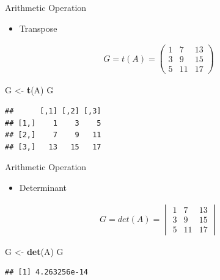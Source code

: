 \documentclass[
  ignorenonframetext,
]{beamer}
\newenvironment{Shaded}{\begin{snugshade}}{\end{snugshade}}
\newcommand{\KeywordTok}[1]{\textcolor[rgb]{0.13,0.29,0.53}{\textbf{#1}}}
\newcommand{\NormalTok}[1]{#1}
\newcommand{\StringTok}[1]{\textcolor[rgb]{0.31,0.60,0.02}{#1}}
\providecommand{\tightlist}{%
  \setlength{\itemsep}{0pt}\setlength{\parskip}{0pt}}
\begin{document}
\begin{frame}[fragile]{Arithmetic Operation}
\protect\hypertarget{arithmetic-operation-2}{}

\begin{itemize}
\tightlist
\item
  Transpose
\end{itemize}

\begin{align*}
G=t(A)=\begin{pmatrix}
1&7&13\\
3&9&15\\
5&11&17
\end{pmatrix}\end{align*}

\begin{Shaded}
\begin{Highlighting}[]
\NormalTok{G <-}\StringTok{ }\KeywordTok{t}\NormalTok{(A)}
\NormalTok{G}
\end{Highlighting}
\end{Shaded}

\begin{verbatim}
##      [,1] [,2] [,3]
## [1,]    1    3    5
## [2,]    7    9   11
## [3,]   13   15   17
\end{verbatim}

\end{frame}

\begin{frame}[fragile]{Arithmetic Operation}
\protect\hypertarget{arithmetic-operation-3}{}

\begin{itemize}
\tightlist
\item
  Determinant
\end{itemize}

\begin{align*}
G=det(A)=\begin{vmatrix}
1&7&13\\
3&9&15\\
5&11&17
\end{vmatrix}\end{align*}

\begin{Shaded}
\begin{Highlighting}[]
\NormalTok{G <-}\StringTok{ }\KeywordTok{det}\NormalTok{(A)}
\NormalTok{G}
\end{Highlighting}
\end{Shaded}

\begin{verbatim}
## [1] 4.263256e-14
\end{verbatim}

\end{frame}
\end{document}
